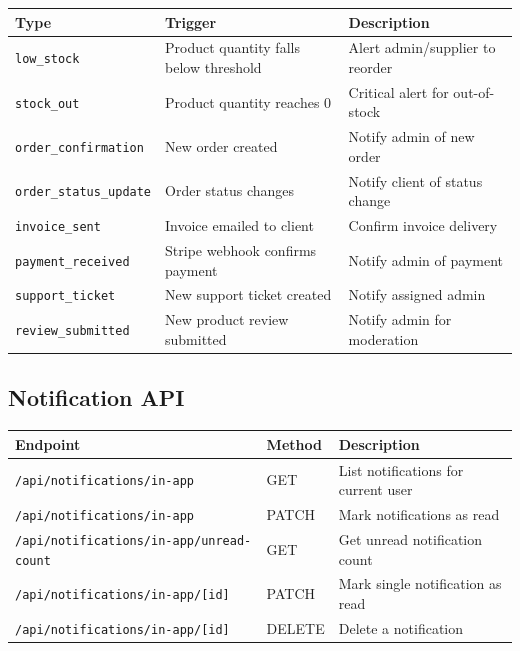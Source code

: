 \documentclass[12pt,a4paper]{report}
\begin{document}
\begin{center}
\begin{tabularx}{\textwidth}{llX}
  \toprule
  \textbf{Type} & \textbf{Trigger} & \textbf{Description} \\
  \midrule
  \texttt{low\_stock}           & Product quantity falls below threshold & Alert admin/supplier to reorder \\
  \texttt{stock\_out}           & Product quantity reaches 0 & Critical alert for out-of-stock \\
  \texttt{order\_confirmation}  & New order created & Notify admin of new order \\
  \texttt{order\_status\_update} & Order status changes & Notify client of status change \\
  \texttt{invoice\_sent}        & Invoice emailed to client & Confirm invoice delivery \\
  \texttt{payment\_received}    & Stripe webhook confirms payment & Notify admin of payment \\
  \texttt{support\_ticket}      & New support ticket created & Notify assigned admin \\
  \texttt{review\_submitted}    & New product review submitted & Notify admin for moderation \\
  \bottomrule
\end{tabularx}
\end{center}

\subsection{Notification API}

\begin{center}
\begin{tabularx}{\textwidth}{llX}
  \toprule
  \textbf{Endpoint} & \textbf{Method} & \textbf{Description} \\
  \midrule
  \texttt{/api/notifications/in-app}              & GET   & List notifications for current user \\
  \texttt{/api/notifications/in-app}              & PATCH & Mark notifications as read \\
  \texttt{/api/notifications/in-app/unread-count} & GET   & Get unread notification count \\
  \texttt{/api/notifications/in-app/[id]}         & PATCH & Mark single notification as read \\
  \texttt{/api/notifications/in-app/[id]}         & DELETE & Delete a notification \\
  \bottomrule
\end{tabularx}
\end{center}
\end{document}
